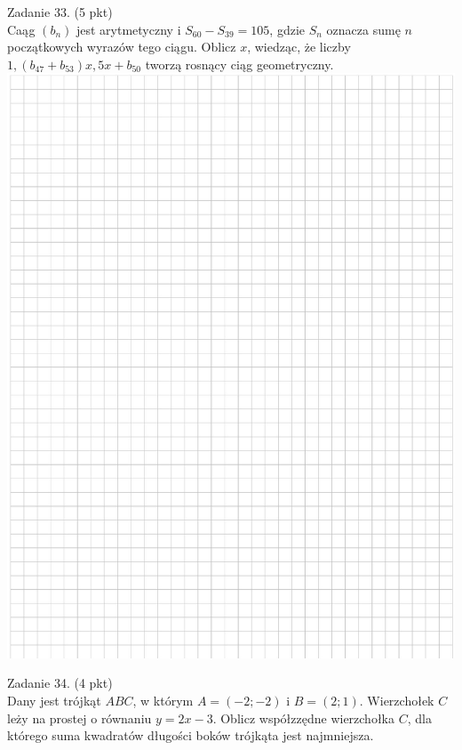 \documentclass[10pt]{article}
\begin{document}
Zadanie 33. (5 pkt)\\
Caąg \(\left(b_{n}\right)\) jest arytmetyczny i \(S_{60}-S_{39}=105\), gdzie \(S_{n}\) oznacza sumę \(n\) początkowych wyrazów tego ciągu. Oblicz \(x\), wiedząc, że liczby \(1,\left(b_{47}+b_{53}\right) x, 5 x+b_{50}\) tworzą rosnący ciąg geometryczny.\\
\includegraphics[max width=\textwidth, center]{2024_11_21_8e981e1ab2c7e641f462g-14}

Zadanie 34. (4 pkt)\\
Dany jest trójkąt \(A B C\), w którym \(A=(-2 ;-2)\) i \(B=(2 ; 1)\). Wierzchołek \(C\) leży na prostej o równaniu \(y=2 x-3\). Oblicz współzzędne wierzchołka \(C\), dla którego suma kwadratów długości boków trójkąta jest najmniejsza.
\end{document}

